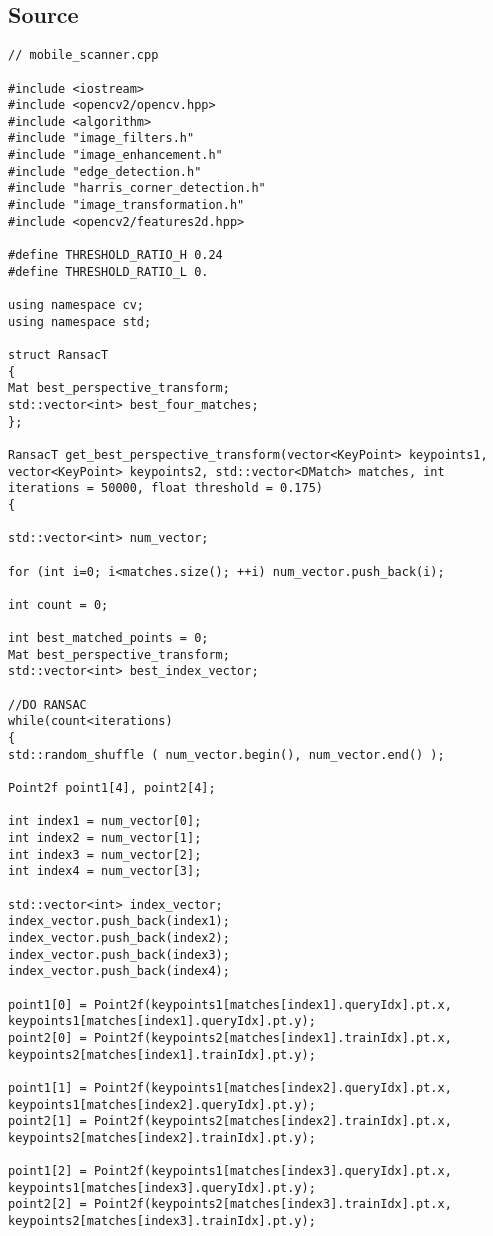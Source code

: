 \subsection{Source}
\begin{lstlisting}
// mobile_scanner.cpp

#include <iostream>
#include <opencv2/opencv.hpp>
#include <algorithm>  
#include "image_filters.h"
#include "image_enhancement.h"
#include "edge_detection.h"
#include "harris_corner_detection.h"
#include "image_transformation.h"
#include <opencv2/features2d.hpp> 

#define THRESHOLD_RATIO_H 0.24
#define THRESHOLD_RATIO_L 0.

using namespace cv;
using namespace std;

struct RansacT
{
Mat best_perspective_transform;
std::vector<int> best_four_matches;
};

RansacT get_best_perspective_transform(vector<KeyPoint> keypoints1, vector<KeyPoint> keypoints2, std::vector<DMatch> matches, int iterations = 50000, float threshold = 0.175)
{

std::vector<int> num_vector;

for (int i=0; i<matches.size(); ++i) num_vector.push_back(i); 

int count = 0;

int best_matched_points = 0;
Mat best_perspective_transform;
std::vector<int> best_index_vector;

//DO RANSAC
while(count<iterations)
{
std::random_shuffle ( num_vector.begin(), num_vector.end() );

Point2f point1[4], point2[4];

int index1 = num_vector[0];
int index2 = num_vector[1];
int index3 = num_vector[2];
int index4 = num_vector[3];

std::vector<int> index_vector;
index_vector.push_back(index1);
index_vector.push_back(index2);
index_vector.push_back(index3);
index_vector.push_back(index4);

point1[0] = Point2f(keypoints1[matches[index1].queryIdx].pt.x, keypoints1[matches[index1].queryIdx].pt.y);
point2[0] = Point2f(keypoints2[matches[index1].trainIdx].pt.x, keypoints2[matches[index1].trainIdx].pt.y);

point1[1] = Point2f(keypoints1[matches[index2].queryIdx].pt.x, keypoints1[matches[index2].queryIdx].pt.y);
point2[1] = Point2f(keypoints2[matches[index2].trainIdx].pt.x, keypoints2[matches[index2].trainIdx].pt.y);

point1[2] = Point2f(keypoints1[matches[index3].queryIdx].pt.x, keypoints1[matches[index3].queryIdx].pt.y);
point2[2] = Point2f(keypoints2[matches[index3].trainIdx].pt.x, keypoints2[matches[index3].trainIdx].pt.y);


\end{lstlisting}

